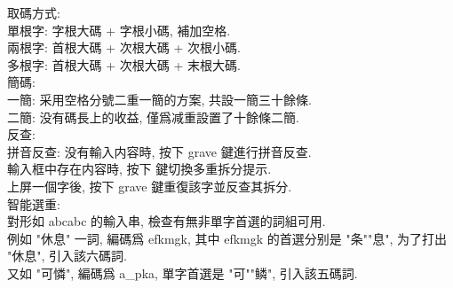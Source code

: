 \documentclass{ctexart}
\begin{document}
    \vspace{2mm}

        \fontsize{14pt}{14pt} \selectfont 

    \begin{multicols}{2}
        取碼方式: \\
        單根字: 字根大碼 + 字根小碼, 補加空格. \\
        兩根字: 首根大碼 + 次根大碼 + 次根小碼. \\
        多根字: 首根大碼 + 次根大碼 + 末根大碼. \\
        \vspace{12pt}
        簡碼: \\
        一簡: 采用空格分號二重一簡的方案, 共設一簡三十餘條. \\
        二簡: 没有碼長上的收益, 僅爲减重設置了十餘條二簡. \\
        \vspace{12pt}
        反查: \\
        拼音反查: 没有輸入内容時, 按下 grave 鍵進行拼音反查. \\
        輸入框中存在内容時, 按下 \/ 鍵切換多重拆分提示. \\
        上屏一個字後, 按下 grave 鍵重復該字並反查其拆分. \\
        \vspace{12pt}
        智能選重: \\
        對形如 abcabc 的輸入串, 檢查有無非單字首選的詞組可用. \\
        例如 "休息" 一詞, 編碼爲 efkmgk, 其中 efk\/mgk 的首選分别是 "条"\/"息", 为了打出 "休息", 引入該六碼詞. \\
        又如 "可憐", 編碼爲 a\_pka, 單字首選是 "可"\/"鳞", 引入該五碼詞.
    \vspace{12pt}
    \end{multicols}
\end{document}
